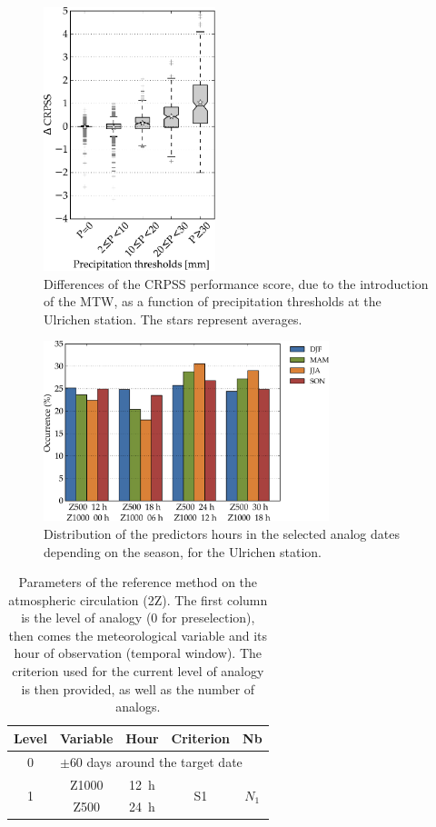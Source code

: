 \documentclass[hess, manuscript]{copernicus}
\begin{document}
\begin{figure}[htb]
	\includegraphics[width=5cm]{figures/changes_CRPS_precip_threshold.pdf}
	\caption{Differences of the CRPSS performance score, due to the introduction of the MTW, as a function of precipitation thresholds at the Ulrichen station. The stars represent averages.}
	\label{fig:changes_CRPS_precip_threshold}
\end{figure}

\begin{figure}[htb]
	\includegraphics[width=8.3cm]{figures/hours_selection_per_season.pdf}
	\caption{Distribution of the predictors hours in the selected analog dates depending on the season, for the Ulrichen station.}
	\label{fig:hours_selection_per_season}
\end{figure}


\clearpage


\begin{table}[htb]
	\caption{Parameters of the reference method on the atmospheric circulation (2Z). The first column is the level of analogy (0 for preselection), then comes the meteorological variable and its hour of observation (temporal window). The criterion used for the current level of analogy is then provided, as well as the number of analogs.}
	\footnotesize
	\begin{center}
		\begin{tabular}{ccccc}
			\hline
			Level & Variable & Hour & Criterion & Nb \\ 
			\hline 
			0 & \multicolumn{4}{l}{$\pm 60$ days around the target date} \\
			\hline 
			\multirow{2}{*}{1} & Z1000 & 12~h & \multirow{2}{*}{S1} & \multirow{2}{*}{$N_{1}$} \\
			& Z500 & 24~h & & \\ 
			\hline 
		\end{tabular} 
	\end{center}
	\label{table:method_2Z}
\end{table}
\end{document}
